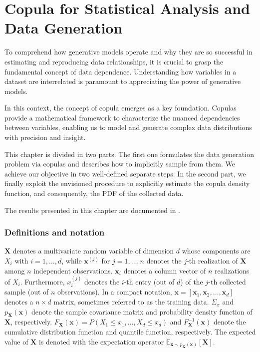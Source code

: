 \chapter{Copula for Statistical Analysis and Data Generation} %
\label{sec:copulas}

To comprehend how generative models operate and why they are so successful in estimating and reproducing data relationships, it is crucial to grasp the fundamental concept of data dependence. Understanding how variables in a dataset are interrelated is paramount to appreciating the power of generative models. 

In this context, the concept of copula emerges as a key foundation. Copulas provide a mathematical framework to characterize the nuanced dependencies between variables, enabling us to model and generate complex data distributions with precision and insight. 

This chapter is divided in two parts. The first one formulates  the data generation problem via copulas and describes how to implicitly sample from them. We achieve our objective in two well-defined separate steps.
In the second part, we finally exploit the envisioned procedure to explicitly estimate the copula density function, and consequently, the PDF of the collected data.

The results presented in this chapter are documented in \cite{Letizia2020,letizia2022copula}.

\subsection*{\textbf{Definitions and notation}}
\label{subsec:notation}
$\mathbf{X}$ denotes a multivariate random variable of dimension $d$ whose components are $X_{i}$ with $i=1,\dots, d$, while $\mathbf{x}^{(j)}$ for $j=1,\dots, n$ denotes the $j$-th realization of $\mathbf{X}$ among $n$ independent observations. $\mathbf{x}_i$ denotes a column vector of $n$ realizations of $X_{i}$. Furthermore, $x_{i}^{(j)}$ denotes the $i$-th entry (out of $d$) of the $j$-th collected sample (out of $n$ observations). In a compact notation, $\mathbf{x}=[\mathbf{x}_1,\mathbf{x}_2,\dots,\mathbf{x}_d]$ denotes a $n\times d$ matrix, sometimes referred to as the training data. 
$\Sigma_x$ and $p_{\mathbf{X}}(\mathbf{x})$ denote the sample covariance matrix and probability density function of $\mathbf{X}$, respectively. $F_{\mathbf{X}}(\mathbf{x}) = P(X_1\leq x_1, \dots, X_d \leq x_d)$ and $F^{-1}_{\mathbf{X}}(\mathbf{x})$ denote the cumulative distribution function and quantile function, respectively. 
The expected value of $\mathbf{X}$ is denoted with the expectation operator $\mathbb{E}_{\mathbf{x}\sim p_{\mathbf{X}}(\mathbf{x})}[\mathbf{X}]$. 

